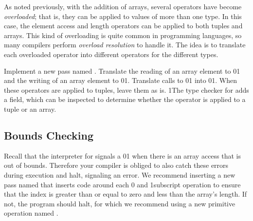 \documentclass[7x10]{TimesAPriori_MIT}%
\def\racketEd{0}
\def\pythonEd{1}
\def\edition{1}
\newcommand{\racket}[1]{{\if\edition\racketEd{#1}\fi}}
\newcommand{\pythonColor}[0]{}
\newcommand{\python}[1]{{\if\edition\pythonEd\pythonColor #1\fi}}
\numberwithin{theorem}{chapter}
\numberwithin{definition}{chapter}
\numberwithin{equation}{chapter}
\begin{document}
As noted previously, with the addition of arrays, several operators
have become \emph{overloaded}; that is, they can be applied to values
of more than one type. In this case, the element access and length
operators can be applied to both tuples and arrays. This kind of
overloading is quite common in programming languages, so many
compilers perform \emph{overload resolution} to handle it. The idea is to translate each overloaded
operator into different operators for the different types.

Implement a new pass named . 
Translate the reading of an array element to
\racket{}\python{}
and the writing of an array element to
\racket{}\python{}.
Translate calls to \racket{}\python{}
into \racket{}\python{}.
When these operators are applied to tuples, leave them as is.
%
\python{The type checker for \LangArray{} adds a \code{has\_type}
  field, which can be inspected to determine whether the operator
  is applied to a tuple or an array.}


\subsection{Bounds Checking}

Recall that the interpreter for \LangArray{} signals a
\racket{}\python{}
when there is an array access that is out of
bounds. Therefore your compiler is obliged to also catch these errors
during execution and halt, signaling an error. We recommend inserting
a new pass named  that inserts code around each
\racket{ and }
\python{subscript} operation to ensure that the index is greater than
or equal to zero and less than the array's length. If not, the program
should halt, for which we recommend using a new primitive operation
named .


\end{document}
